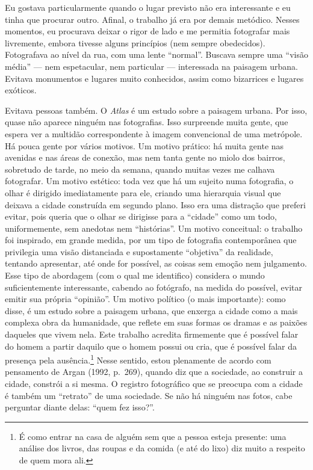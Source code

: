 Eu gostava particularmente quando o lugar previsto não era interessante
e eu tinha que procurar outro. Afinal, o trabalho já era por demais
metódico. Nesses momentos, eu procurava deixar o rigor de lado e me
permitia fotografar mais livremente, embora tivesse alguns princípios
(nem sempre obedecidos). Fotografava ao nível da rua, com uma lente
``normal''. Buscava sempre uma ``visão média'' --- nem espetacular, nem
particular --- interessada na paisagem urbana. Evitava monumentos e lugares
muito conhecidos, assim como bizarrices e lugares exóticos.

Evitava pessoas também. O \emph{Atlas} é um estudo sobre a paisagem
urbana. Por isso, quase não aparece ninguém nas fotografias. Isso
surpreende muita gente, que espera ver a multidão correspondente à
imagem convencional de uma metrópole. Há pouca gente por vários motivos.
Um motivo prático: há muita gente nas avenidas e nas áreas de conexão,
mas nem tanta gente no miolo dos bairros, sobretudo de tarde, no meio da
semana, quando muitas vezes me calhava fotografar. Um motivo estético:
toda vez que há um sujeito numa fotografia, o olhar é dirigido
imediatamente para ele, criando uma hierarquia visual que deixava a
cidade construída em segundo plano. Isso era uma distração que preferi
evitar, pois queria que o olhar se dirigisse para a ``cidade'' como um
todo, uniformemente, sem anedotas nem ``histórias''. Um motivo
conceitual: o trabalho foi inspirado, em grande medida, por um tipo de
fotografia contemporânea que privilegia uma visão distanciada e
supostamente ``objetiva'' da realidade, tentando apresentar, até onde
for possível, as coisas sem emoção nem julgamento. Esse tipo de
abordagem (com o qual me identifico) considera o mundo suficientemente
interessante, cabendo ao fotógrafo, na medida do possível, evitar emitir
sua própria ``opinião''. Um motivo político (o mais importante): como
disse, é um estudo sobre a paisagem urbana, que enxerga a cidade como a
mais complexa obra da humanidade, que reflete em suas formas os dramas e
as paixões daqueles que vivem nela. Este trabalho acredita firmemente
que é possível falar do homem a partir daquilo que o homem possui ou
cria, que é possível falar da presença pela ausência.\footnote{É como entrar na casa de alguém sem que a pessoa esteja
  presente: uma análise dos livros, das roupas e da comida (e até do
  lixo) diz muito a respeito de quem mora ali.} Nesse sentido, estou
plenamente de acordo com pensamento de Argan (1992, p.~269), quando diz que a sociedade, ao construir a cidade, constrói a si mesma. O registro fotográfico que se preocupa com
a cidade é também um ``retrato'' de uma sociedade. Se não há ninguém nas
fotos, cabe perguntar diante delas: ``quem fez isso?''.

